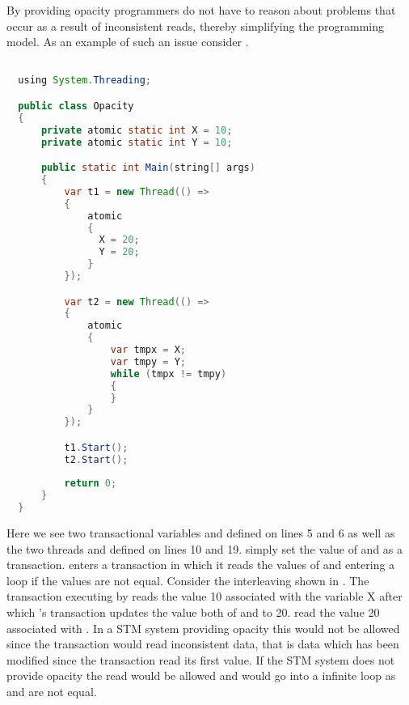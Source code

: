 By providing opacity programmers do not have to reason about problems that occur as a result of inconsistent reads\cite[p. 28]{harris2010transactional}, thereby simplifying the programming model. As an example of such an issue consider .

\begin{lstlisting}[label=lst:stm_opacity,
  caption={Opacity example},
  language=Java,  
  showspaces=false,
  showtabs=false,
  breaklines=true,
  showstringspaces=false,
  breakatwhitespace=true,
  commentstyle=\color{greencomments},
  keywordstyle=\color{bluekeywords},
  stringstyle=\color{redstrings},
  morekeywords={atomic, retry, orelse, var, get, set, using}]  % Start your code-block

  using System.Threading;

  public class Opacity
  {
      private atomic static int X = 10;
      private atomic static int Y = 10;

      public static int Main(string[] args)
      {
          var t1 = new Thread(() =>
          {
              atomic
              {
                X = 20;
                Y = 20;
              }
          });

          var t2 = new Thread(() =>
          {
              atomic
              {
                  var tmpx = X;
                  var tmpy = Y;
                  while (tmpx != tmpy)
                  {
                  }
              }
          });

          t1.Start();
          t2.Start();
        
          return 0;
      }
  }
\end{lstlisting}
Here we see two transactional variables  and  defined on lines 5 and 6 as well as the two threads  and  defined on lines 10 and 19.  simply set the value of  and  as a transaction.  enters a transaction in which it reads the values of  and  entering a loop if the values are not equal. Consider the interleaving shown in . The transaction executing by  reads the value 10 associated with the variable X after which 's transaction updates the value both of  and  to 20.  read the value 20 associated with . In a \ac{STM} system providing opacity this would not be allowed since the transaction would read inconsistent data, that is data which has been modified since the transaction read its first value. If the \ac{STM} system does not provide opacity the read would be allowed and  would go into a infinite loop as  and  are not equal. 

